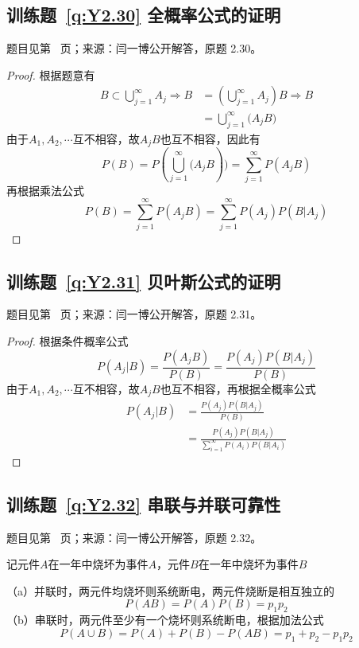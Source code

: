 \documentclass[UTF8,12pt,a4paper,fontset=fandol]{ctexbook}
\begin{document}
\subsection*{训练题~\ref{q:Y2.30} 全概率公式的证明}\label{a:Y2.30}{\small 题目见第~\pageref{q:Y2.30} 页；来源：闫一博公开解答，原题 2.30。}
\begin{proof}
根据题意有
\[\begin{aligned}B \subset \bigcup\limits_{j = 1}^\infty  {{A_j}}  \Rightarrow B &= (\bigcup\limits_{j = 1}^\infty  {{A_j}} )B \Rightarrow B \\&= \bigcup\limits_{j = 1}^\infty  {({A_j}} B)\end{aligned}\]
由于$A_1,A_2,\cdots$互不相容，故$A_jB$也互不相容，因此有
\[P(B) = P(\bigcup\limits_{j = 1}^\infty  {({A_j}} B)) = \sum\limits_{j = 1}^\infty  {P({A_j}B)} \]
再根据乘法公式
\[P(B) = \sum\limits_{j = 1}^\infty  {P({A_j}B)}  = \sum\limits_{j = 1}^\infty  {P({A_j})P(B|{A_j})} \]
\end{proof}

\subsection*{训练题~\ref{q:Y2.31} 贝叶斯公式的证明}\label{a:Y2.31}{\small 题目见第~\pageref{q:Y2.31} 页；来源：闫一博公开解答，原题 2.31。}
\begin{proof}
根据条件概率公式
  \[P({A_j}|B) = \frac{{P({A_j}B)}}{{P(B)}} = \frac{{P({A_j})P(B|{A_j})}}{{P(B)}}\]
由于$A_1,A_2,\cdots$互不相容，故$A_jB$也互不相容，再根据全概率公式
\[\begin{aligned}P({A_j}|B) &= \frac{{P({A_j})P(B|{A_j})}}{{P(B)}} \\&= \frac{{P({A_j})P(B|{A_j})}}{{\sum\limits_{i = 1}^\infty  {P({A_i})P(B|{A_i})} }}\end{aligned}\]

\end{proof}

\subsection*{训练题~\ref{q:Y2.32} 串联与并联可靠性}\label{a:Y2.32}{\small 题目见第~\pageref{q:Y2.32} 页；来源：闫一博公开解答，原题 2.32。}
\begin{solve}
记元件$A$在一年中烧坏为事件$A$，元件$B$在一年中烧坏为事件$B$

（a）并联时，两元件均烧坏则系统断电，两元件烧断是相互独立的
\[P(AB) = P(A)P(B) = {p_1}{p_2}\]
（b）串联时，两元件至少有一个烧坏则系统断电，根据加法公式
\[P(A \cup B) = P(A) + P(B) - P(AB) = {p_1} + {p_2} - {p_1}{p_2}\]
\end{solve}
\end{document}
